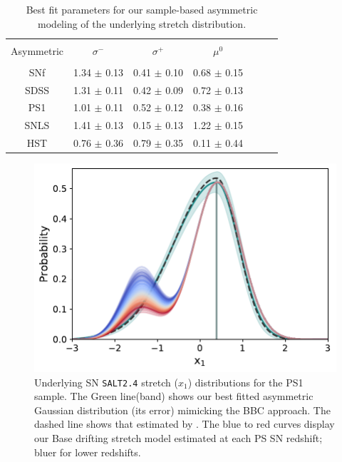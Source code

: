 \documentclass[]{aa} %
\begin{document}

\begin{table}
    \centering
    \caption{Best fit parameters for our sample-based asymmetric modeling of the
    underlying stretch distribution.}
    \label{tab:bbc}
    \begin{tabular}{c c c c c c c}\hline\hline\\[-0.8em]
    Asymmetric & $\sigma^-$ & $\sigma^+$ & $\mu^0$ \\\hline\\[-0.8em]
    SNf &  1.34 $\pm$ 0.13 & 0.41 $\pm$ 0.10 & 0.68 $\pm$ 0.15\\[0.15em]
    SDSS & 1.31 $\pm$ 0.11 & 0.42 $\pm$ 0.09 & 0.72 $\pm$ 0.13 \\[0.15em]
    PS1 &  1.01 $\pm$ 0.11 & 0.52 $\pm$ 0.12 & 0.38 $\pm$ 0.16 \\[0.15em]
    SNLS & 1.41 $\pm$ 0.13 & 0.15 $\pm$ 0.13 & 1.22 $\pm$ 0.15 \\[0.15em]
    HST &  0.76 $\pm$ 0.36 & 0.79 $\pm$ 0.35 & 0.11 $\pm$ 0.44 \\\hline\hline
    \end{tabular}
\end{table}

\begin{figure}
    \centering
    \includegraphics[width=\linewidth]{Article_figures/bbc_comp_PS1.pdf}
    \caption{Underlying SN \textsc{\texttt{SALT2.4}} stretch ($x_1$)
        distributions for the PS1 sample. The Green line(band) shows our best
        fitted asymmetric Gaussian distribution (its error) mimicking the BBC
        approach. The dashed line shows that estimated by \cite{scolnic2018a}.
    The blue to red curves display our Base drifting stretch model estimated at
each PS SN redshift; bluer for lower redshifts.}
    \label{fig:bbc_pdf_ps1}
\end{figure}
\end{document}
